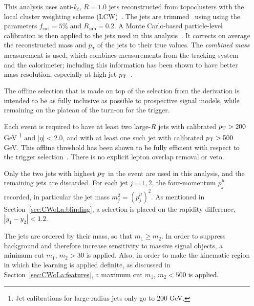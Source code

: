 This analysis uses anti-$k_t$, $R=1.0$ jets reconstructed from topoclusters with the local cluster weighting scheme (LCW)~\cite{Aad:2016upy}.
The jets are trimmed~\cite{Krohn:2009th} using using the parameters $f_\text{cut} = 5\%$ and $R_\text{sub} = 0.2$.
A Monte Carlo-based particle-level calibration is then applied to the jets used in this analysis~\cite{Aaboud:2018kfi}.
It corrects on average the reconstructed mass and $p_T$ of the jets to their true values.
The \textit{combined mass} measurement is used, which combines measurements from the tracking system and the calorimeter; including this information has been shown to have better mass resolution, especially at high jet $p_{\text{T}}$~\cite{ATLAS-CONF-2016-035}.

The offline selection that is made on top of the selection from the derivation is intended to be as fully inclusive as possible to prospective signal models, while remaining on the plateau of the turn-on for the trigger.

Each event is required to have at least two large-$R$ jets with calibrated $p_{\text{T}}>200$ GeV
\footnote{Jet calibrations for large-radius jets only go to 200 GeV.
}
and $|\eta|<2.0$, and with at least one such jet with calibrated $p_{\text{T}}>500$ GeV.
This offline threshold has been shown to be fully efficient with respect to the trigger selection~\cite{Adorni:2647394}.
There is no explicit lepton overlap removal or veto.

Only the two jets with highest $p_{\text{T}}$ in the event are used in this analysis, and the remaining jets are discarded.
For each jet $j=1,2$, the four-momentum $p^\mu_j$ recorded, in particular the jet mass $m_j^2 = (p^\mu_j)^2$.
As mentioned in Section~\ref{sec:CWoLa:blinding}, a selection is placed on the rapidity difference, $|y_1-y_2|<1.2$.

The jets are ordered by their mass, so that $m_1 \ge m_2$.
In order to suppress background and therefore increase sensitivity to massive signal objects, a minimum cut $m_1$, $m_2 > 30$ \GeV{} is applied.
Also, in order to make the kinematic region in which the learning is applied definite, as discussed in Section~\ref{sec:CWoLa:features}, a maximum cut $m_1$, $m_2 < 500$ \GeV{} is applied.

